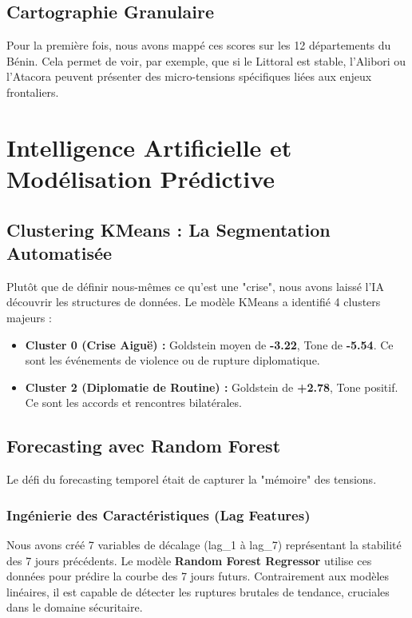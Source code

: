 \documentclass[12pt,a4paper]{article}
\begin{document}
\subsection{Cartographie Granulaire}
Pour la première fois, nous avons mappé ces scores sur les 12 départements du Bénin. Cela permet de voir, par exemple, que si le Littoral est stable, l'Alibori ou l'Atacora peuvent présenter des micro-tensions spécifiques liées aux enjeux frontaliers.

\section{Intelligence Artificielle et Modélisation Prédictive}
\subsection{Clustering KMeans : La Segmentation Automatisée}
Plutôt que de définir nous-mêmes ce qu'est une "crise", nous avons laissé l'IA découvrir les structures de données. Le modèle KMeans a identifié 4 clusters majeurs :
\begin{itemize}
    \item \textbf{Cluster 0 (Crise Aiguë) :} Goldstein moyen de \textbf{-3.22}, Tone de \textbf{-5.54}. Ce sont les événements de violence ou de rupture diplomatique.
    \item \textbf{Cluster 2 (Diplomatie de Routine) :} Goldstein de \textbf{+2.78}, Tone positif. Ce sont les accords et rencontres bilatérales.
\end{itemize}

\subsection{Forecasting avec Random Forest}
Le défi du forecasting temporel était de capturer la "mémoire" des tensions. 
\subsubsection{Ingénierie des Caractéristiques (Lag Features)}
Nous avons créé 7 variables de décalage (lag\_1 à lag\_7) représentant la stabilité des 7 jours précédents. Le modèle \textbf{Random Forest Regressor} utilise ces données pour prédire la courbe des 7 jours futurs. Contrairement aux modèles linéaires, il est capable de détecter les ruptures brutales de tendance, cruciales dans le domaine sécuritaire.
\end{document}
